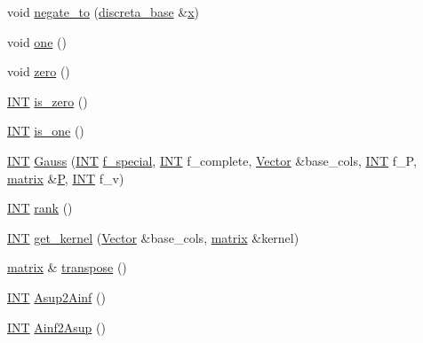 \begin{DoxyCompactItemize}
void \mbox{\hyperlink{classmatrix_acb93b95943eee2253b7b3b799333a24c}{negate\+\_\+to}} (\mbox{\hyperlink{classdiscreta__base}{discreta\+\_\+base}} \&\mbox{\hyperlink{alphabet2_8_c_a6150e0515f7202e2fb518f7206ed97dc}{x}})
\item 
void \mbox{\hyperlink{classmatrix_a780b461503be22827c4fdca66f779be1}{one}} ()
\item 
void \mbox{\hyperlink{classmatrix_abd2e274d4905bc97eabf7c72d5e66b3d}{zero}} ()
\item 
\mbox{\hyperlink{galois_8h_a09fddde158a3a20bd2dcadb609de11dc}{I\+NT}} \mbox{\hyperlink{classmatrix_a1940fae0fd429e77918eaa3d68cecd12}{is\+\_\+zero}} ()
\item 
\mbox{\hyperlink{galois_8h_a09fddde158a3a20bd2dcadb609de11dc}{I\+NT}} \mbox{\hyperlink{classmatrix_a74aa38df064afa998cb0973ac3554ac0}{is\+\_\+one}} ()
\item 
\mbox{\hyperlink{galois_8h_a09fddde158a3a20bd2dcadb609de11dc}{I\+NT}} \mbox{\hyperlink{classmatrix_abe8ed121d6bc29e1cc4432ad45542450}{Gauss}} (\mbox{\hyperlink{galois_8h_a09fddde158a3a20bd2dcadb609de11dc}{I\+NT}} \mbox{\hyperlink{simeon_8_c_a5c9bb19da4c942e41c1d5cfc81f4cfd7}{f\+\_\+special}}, \mbox{\hyperlink{galois_8h_a09fddde158a3a20bd2dcadb609de11dc}{I\+NT}} f\+\_\+complete, \mbox{\hyperlink{class_vector}{Vector}} \&base\+\_\+cols, \mbox{\hyperlink{galois_8h_a09fddde158a3a20bd2dcadb609de11dc}{I\+NT}} f\+\_\+P, \mbox{\hyperlink{classmatrix}{matrix}} \&\mbox{\hyperlink{simeon_8_c_a7fa15551e800919e93401fbbcd8e71e8}{P}}, \mbox{\hyperlink{galois_8h_a09fddde158a3a20bd2dcadb609de11dc}{I\+NT}} f\+\_\+v)
\item 
\mbox{\hyperlink{galois_8h_a09fddde158a3a20bd2dcadb609de11dc}{I\+NT}} \mbox{\hyperlink{classmatrix_a6248f2f23a2b0f011a21548cced5dc1f}{rank}} ()
\item 
\mbox{\hyperlink{galois_8h_a09fddde158a3a20bd2dcadb609de11dc}{I\+NT}} \mbox{\hyperlink{classmatrix_a75b3e1c7074bea2d399601ed2cff7a42}{get\+\_\+kernel}} (\mbox{\hyperlink{class_vector}{Vector}} \&base\+\_\+cols, \mbox{\hyperlink{classmatrix}{matrix}} \&kernel)
\item 
\mbox{\hyperlink{classmatrix}{matrix}} \& \mbox{\hyperlink{classmatrix_a1d8064be96298b81e8e060f02b9cef3e}{transpose}} ()
\item 
\mbox{\hyperlink{galois_8h_a09fddde158a3a20bd2dcadb609de11dc}{I\+NT}} \mbox{\hyperlink{classmatrix_a6ec12bab511dbb2f1426515819359390}{Asup2\+Ainf}} ()
\item 
\mbox{\hyperlink{galois_8h_a09fddde158a3a20bd2dcadb609de11dc}{I\+NT}} \mbox{\hyperlink{classmatrix_a7abdfef775e6f1e68856bbdb06004dce}{Ainf2\+Asup}} ()

\end{DoxyCompactItemize}
